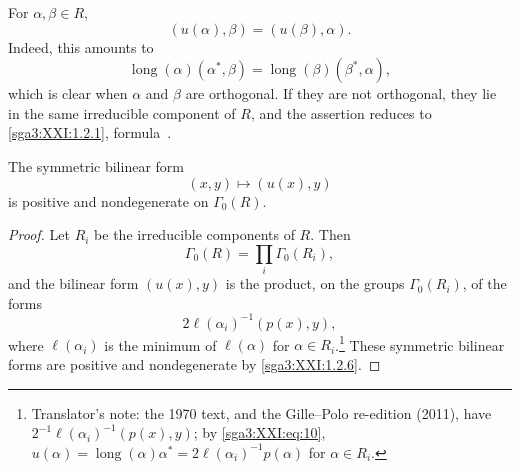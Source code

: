\begin{remark}\label{sga3:XXI:7.2.8}
For \(\alpha,\beta\in R\),
\[
 (u(\alpha),\beta)=(u(\beta),\alpha).
\]
Indeed, this amounts to
\[
 \operatorname{long}(\alpha)(\alpha^\ast,\beta)
 =
 \operatorname{long}(\beta)(\beta^\ast,\alpha),
\]
which is clear when \(\alpha\) and \(\beta\) are orthogonal.  If
they are not orthogonal, they lie in the same irreducible component
of \(R\), and the assertion reduces to \ref{sga3:XXI:1.2.1},
formula~.
\end{remark}

\begin{remark}\label{sga3:XXI:7.2.9}
The symmetric bilinear form
\[
 (x,y)\longmapsto(u(x),y)
\]
is positive and nondegenerate on \(\Gamma_0(R)\).
\end{remark}

\begin{proof}
Let \(R_i\) be the irreducible components of \(R\).  Then
\[
 \Gamma_0(R)=\prod_i\Gamma_0(R_i),
\]
and the bilinear form \((u(x),y)\) is the product, on the groups
\(\Gamma_0(R_i)\), of the forms
\[
 2\ell(\alpha_i)^{-1}(p(x),y),
\]
where \(\ell(\alpha_i)\) is the minimum of \(\ell(\alpha)\) for
\(\alpha\in R_i\).\footnote{Translator's note: the 1970 text, and the Gille--Polo
re-edition (2011), have \(2^{-1}\ell(\alpha_i)^{-1}(p(x),y)\); by
\eqref{sga3:XXI:eq:10}, \(u(\alpha)=\operatorname{long}(\alpha)\alpha^\ast
=2\ell(\alpha_i)^{-1}p(\alpha)\) for \(\alpha\in R_i\).}  These symmetric bilinear forms are positive
and nondegenerate by \ref{sga3:XXI:1.2.6}.
\end{proof}
